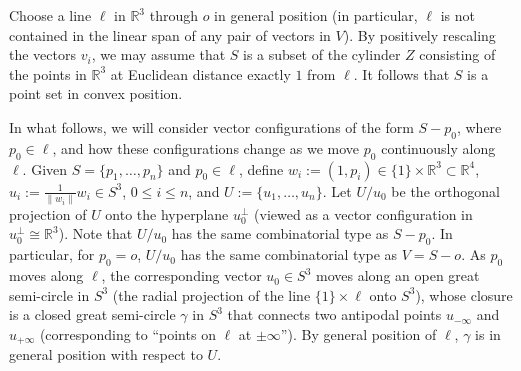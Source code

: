 \documentclass[a4paper,USenglish,cleveref, autoref, thm-restate,nolineno]{socg-lipics-v2021}
\renewcommand{\leq}{\leqslant}
\newcommand{\R}{\mathbb{R}}
\begin{document}
Choose a line $\ell$ in $\R^3$ through $o$ in general position (in particular, $\ell$ is not contained in the linear span of any pair of vectors in $V$). By positively rescaling the vectors $v_i$, 
we may assume that $S$ is a subset of the cylinder  $Z$ consisting of the points in $\R^3$ at Euclidean distance exactly $1$ from $\ell$. It follows that $S$ is a point set in convex position.

In what follows, we will consider vector configurations of the form $S-p_0$, where $p_0\in \ell$, and how these configurations change as we move $p_0$ continuously along $\ell$. 
Given $S=\{p_1,\dots,p_n\}$ and $p_0\in \ell$, define $w_i:=(1,p_i) \in \{1\}\times \R^3 \subset \R^4$, $u_i:=\frac{1}{\|w_i\|}w_i \in S^3$, $0\leq i\leq n$, and $U:=\{u_1,\dots, u_n\}$. Let $U/u_0$ be the orthogonal projection of $U$ onto the hyperplane $u_0^\bot$ (viewed as a vector configuration in $u_0^\bot\cong \R^3$). Note that $U/u_0$ has the same combinatorial type as $S-p_0$. In particular, for $p_0=o$, $U/u_0$ has the same combinatorial type as $V=S-o$.
As $p_0$ moves along $\ell$, the corresponding vector $u_0 \in S^3$ moves along an open great semi-circle in $S^3$ (the radial projection of the line $\{1\}\times \ell$ onto $S^3$), whose closure is a closed great semi-circle $\gamma$ in $S^3$ that connects two antipodal points $u_{-\infty}$ and $u_{+\infty}$ (corresponding to ``points on $\ell$ at $\pm \infty$''). By general position of $\ell$, $\gamma$ is in general position with respect to $U$.
\end{document}
